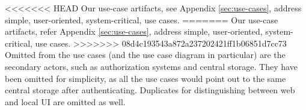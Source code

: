 <<<<<<< HEAD
Our use-case artifacts, see Appendix \ref{sec:use-cases}, address simple, user-oriented, system-critical, use cases.
=======
Our use-case artifacts, refer Appendix \ref{sec:use-cases}, address simple, user-oriented, system-critical, use cases.
>>>>>>> 08d4c193543a872a237202421ff1b06851d7cc73
Omitted from the use cases (and the use case diagram in particular) are the secondary actors, such as authorization systems and central storage.
They have been omitted for simplicity, as all the use cases would point out to the same central storage after authenticating. Duplicates for distinguishing between web  and local UI are omitted as well.
